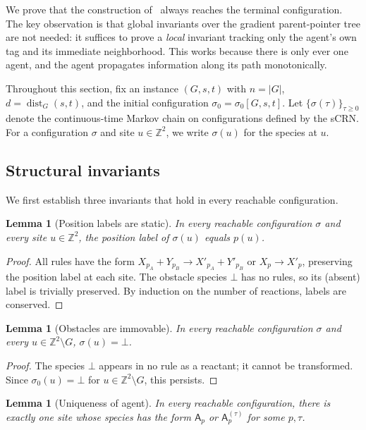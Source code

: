 \documentclass[11pt]{article}
\theoremstyle{plain}
\newtheorem{lemma}[theorem]{Lemma}
\theoremstyle{definition}
\theoremstyle{remark}
\newcommand{\Z}{\mathbb{Z}}
\DeclareMathOperator{\dist}{dist}
\begin{document}
We prove that the construction of~ always reaches the terminal configuration. The key observation is that global invariants over the gradient parent-pointer tree are not needed: it suffices to prove a \emph{local} invariant tracking only the agent's own tag and its immediate neighborhood. This works because there is only ever one agent, and the agent propagates information along its path monotonically.

Throughout this section, fix an instance $(G, s, t)$ with $n = |G|$, $d = \dist_G(s, t)$, and the initial configuration $\sigma_0 = \sigma_0[G, s, t]$. Let $\{\sigma(\tau)\}_{\tau \geq 0}$ denote the continuous-time Markov chain on configurations defined by the sCRN. For a configuration $\sigma$ and site $u \in \Z^2$, we write $\sigma(u)$ for the species at $u$.

\subsection{Structural invariants}

We first establish three invariants that hold in every reachable configuration.

\begin{lemma}[Position labels are static]
\label{lem:static-labels}
In every reachable configuration $\sigma$ and every site $u \in \Z^2$, the position label of $\sigma(u)$ equals $p(u)$.
\end{lemma}

\begin{proof}
All rules have the form $X_{p_A} + Y_{p_B} \to X'_{p_A} + Y'_{p_B}$ or $X_p \to X'_p$, preserving the position label at each site. The obstacle species $\bot$ has no rules, so its (absent) label is trivially preserved. By induction on the number of reactions, labels are conserved.
\end{proof}

\begin{lemma}[Obstacles are immovable]
\label{lem:static-obstacles}
In every reachable configuration $\sigma$ and every $u \in \Z^2 \setminus G$, $\sigma(u) = \bot$.
\end{lemma}

\begin{proof}
The species $\bot$ appears in no rule as a reactant; it cannot be transformed. Since $\sigma_0(u) = \bot$ for $u \in \Z^2 \setminus G$, this persists.
\end{proof}

\begin{lemma}[Uniqueness of agent]
\label{lem:unique-agent}
In every reachable configuration, there is exactly one site whose species has the form $\mathsf{A}_{p}$ or $\mathsf{A}^{(\tau)}_{p}$ for some $p, \tau$.
\end{lemma}
\end{document}
